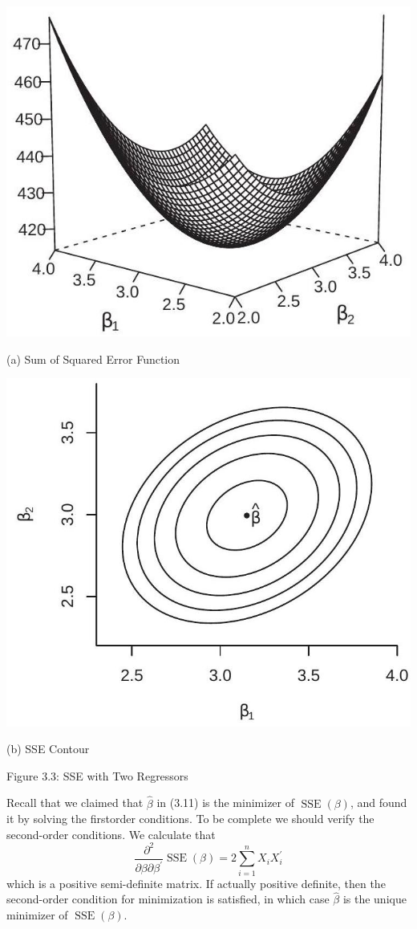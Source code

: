 \documentclass[10pt]{article}
\begin{document}
\includegraphics[max width=\textwidth]{2022_09_17_333a3ece3fb3afcc15d0g-07}

(a) Sum of Squared Error Function

\includegraphics[max width=\textwidth]{2022_09_17_333a3ece3fb3afcc15d0g-07(1)}

(b) SSE Contour

Figure 3.3: SSE with Two Regressors

Recall that we claimed that $\widehat{\beta}$ in (3.11) is the minimizer of $\operatorname{SSE}(\beta)$, and found it by solving the firstorder conditions. To be complete we should verify the second-order conditions. We calculate that
$$
\frac{\partial^{2}}{\partial \beta \partial \beta^{\prime}} \operatorname{SSE}(\beta)=2 \sum_{i=1}^{n} X_{i} X_{i}^{\prime}
$$
which is a positive semi-definite matrix. If actually positive definite, then the second-order condition for minimization is satisfied, in which case $\widehat{\beta}$ is the unique minimizer of $\operatorname{SSE}(\beta)$.
\end{document}
